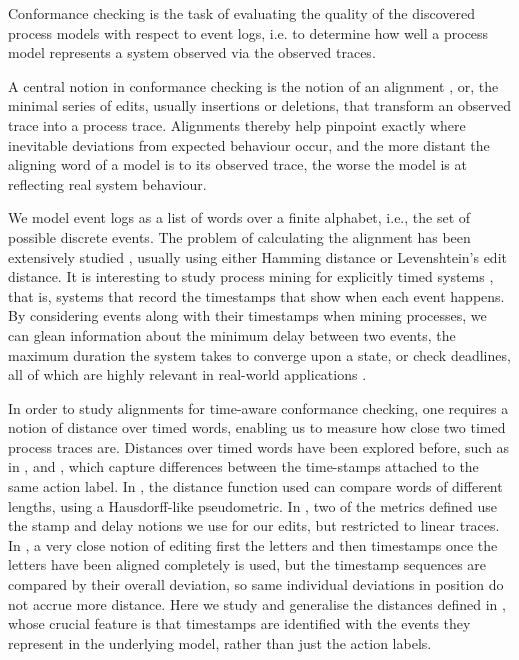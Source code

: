 \documentclass[runningheads]{llncs}
\begin{document}
    
Conformance checking %
is the task of evaluating the quality of the discovered
process models with respect to event logs, i.e. to determine how well a process model
represents a system observed via the observed traces.
    
A central notion in conformance checking is the notion of an alignment \cite{Adriansyah2014AligningOA}, or, the minimal series of edits, usually insertions or deletions, that transform an observed trace into a process trace.  
    Alignments thereby help pinpoint exactly where inevitable deviations from expected behaviour occur, and the more distant the aligning word of a model is to its observed trace, the worse the model is at reflecting real system behaviour. 
    
    We model event logs as a list of words over a finite alphabet, i.e., the set of possible discrete events. 
    The problem of calculating the alignment has been extensively studied \cite{Adriansyah2014AligningOA} \cite{BCC21}, usually using either Hamming distance or Levenshtein's edit distance. 
    It is interesting to study process mining for explicitly timed systems \cite{RMAW13} \cite{CRHA20}  \cite{AS21}, that is, systems that record the timestamps that show when each event happens. 
    By considering events along with their timestamps when mining processes, we can glean information about the minimum delay between two events, the maximum duration the system takes to converge upon a state, or check deadlines, all of which are highly relevant in real-world applications \cite{Cheikhrouhou2014TheTP} \cite{Eder1999TimeCI} \cite{inbook}. 
    
    In order to study alignments for time-aware conformance checking, one requires a notion of distance over timed words, enabling us to measure how close two timed process traces are. 
Distances over timed words have been explored before, such as in \cite{ABD18}, \cite{GHJ97} and \cite{CJM14}, which capture differences between the time-stamps attached to the same action label. 
In \cite{ABD18}, the distance function used can compare words of different lengths, using a Hausdorff-like pseudometric. In \cite{GHJ97}, two of the metrics defined use the stamp and delay notions we use for our edits, but restricted to linear traces. In \cite{CJM14}, a very close notion of editing first the letters and then timestamps once the letters have been aligned completely is used, but the timestamp sequences are compared by their overall deviation, so same individual deviations in position do not accrue more distance. 
Here we study and generalise the distances defined in \cite{CR22}, whose crucial feature is that timestamps are identified with the events they represent in the underlying model, rather than just the action labels. 
\end{document}
